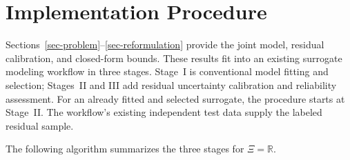 \documentclass[review,11pt,3p,authoryear,nopreprintline]{elsarticle}
\begin{document}


\section{Implementation Procedure}
\label{sec-implementation}

Sections~\ref{sec-problem}--\ref{sec-reformulation} provide the joint model, residual calibration, and closed-form bounds. These results fit into an existing surrogate modeling workflow in three stages. Stage~I is conventional model fitting and selection; Stages~II and III add residual uncertainty calibration and reliability assessment. For an already fitted and selected surrogate, the procedure starts at Stage~II. The workflow's existing independent test data supply the labeled residual sample.

The following algorithm summarizes the three stages for $\Xi=\mathbb R$.
\end{document}
